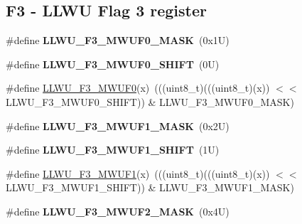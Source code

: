 \subsection*{F3 -\/ L\+L\+WU Flag 3 register}
\begin{DoxyCompactItemize}
\item 
\mbox{\label{group___l_l_w_u___register___masks_ga1bb6bf136de15f4cc67eee67d53361a9}} 
\#define {\bfseries L\+L\+W\+U\+\_\+\+F3\+\_\+\+M\+W\+U\+F0\+\_\+\+M\+A\+SK}~(0x1\+U)
\item 
\mbox{\label{group___l_l_w_u___register___masks_ga3b2c7982efa30073491d05e0dbc698e8}} 
\#define {\bfseries L\+L\+W\+U\+\_\+\+F3\+\_\+\+M\+W\+U\+F0\+\_\+\+S\+H\+I\+FT}~(0\+U)
\item 
\#define \mbox{\hyperlink{group___l_l_w_u___register___masks_ga3e088b69ca585116274b771ce4915311}{L\+L\+W\+U\+\_\+\+F3\+\_\+\+M\+W\+U\+F0}}(x)~(((uint8\+\_\+t)(((uint8\+\_\+t)(x)) $<$$<$ L\+L\+W\+U\+\_\+\+F3\+\_\+\+M\+W\+U\+F0\+\_\+\+S\+H\+I\+FT)) \& L\+L\+W\+U\+\_\+\+F3\+\_\+\+M\+W\+U\+F0\+\_\+\+M\+A\+SK)
\item 
\mbox{\label{group___l_l_w_u___register___masks_gafe847acbd5a46291dd05b8ab682efffe}} 
\#define {\bfseries L\+L\+W\+U\+\_\+\+F3\+\_\+\+M\+W\+U\+F1\+\_\+\+M\+A\+SK}~(0x2\+U)
\item 
\mbox{\label{group___l_l_w_u___register___masks_ga6de4a2380bde727b70758cd1c818c859}} 
\#define {\bfseries L\+L\+W\+U\+\_\+\+F3\+\_\+\+M\+W\+U\+F1\+\_\+\+S\+H\+I\+FT}~(1\+U)
\item 
\#define \mbox{\hyperlink{group___l_l_w_u___register___masks_ga0102aac1d58b1c1a89c197c845f832a6}{L\+L\+W\+U\+\_\+\+F3\+\_\+\+M\+W\+U\+F1}}(x)~(((uint8\+\_\+t)(((uint8\+\_\+t)(x)) $<$$<$ L\+L\+W\+U\+\_\+\+F3\+\_\+\+M\+W\+U\+F1\+\_\+\+S\+H\+I\+FT)) \& L\+L\+W\+U\+\_\+\+F3\+\_\+\+M\+W\+U\+F1\+\_\+\+M\+A\+SK)
\item 
\mbox{\label{group___l_l_w_u___register___masks_ga3414123c30550a3dea14d84f931e2a0c}} 
\#define {\bfseries L\+L\+W\+U\+\_\+\+F3\+\_\+\+M\+W\+U\+F2\+\_\+\+M\+A\+SK}~(0x4\+U)
\item 
\mbox{\label{group___l_l_w_u___register___masks_gac83dee08de7a4bdce21d454a9cfab059}} 

\end{DoxyCompactItemize}
